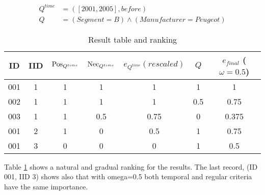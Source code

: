 %
%
%


\begin{align}
Q^{time} & = \left(\left[ 2001, 2005 \right], before\right) \\
Q & = \left(Segment =  B\right) \wedge \left(Manufacturer = Peugeot\right)
\end{align}


\begin{table}[ht]
\caption{Result table and ranking}
\centering
\begin{tabular}{c c c c c c c}
\hline
ID & IID &  $\operatorname{Pos}_{Q^{time}}$ & $\operatorname{Nec}_{Q^{time}}$ & $e_{Q^{time}} (rescaled)$ & $Q$ & $e_{final}$ ($\omega=0.5$) \\ [0.5ex]
\hline
001 & 1 & 1 &  1 & 1 & 1 & 1 \\
002 & 1 & 1 & 1 & 1 & 0.5 & 0.75 \\
003 & 1 & 1 & 0.5 & 0.75 &0 & 0.375\\
001 & 2 & 1 & 0 & 0.5 &1 & 0.75 \\
001 & 3 & 0 & 0 & 0 &1 & 0.5\\
\hline
\end{tabular}
\label{tb:results}
\end{table}

Table \ref{tb:results} shows a natural and gradual ranking for the results. The last record, (ID 001, IID 3) shows also that with omega=0.5 both temporal and regular criteria have the same importance.%


